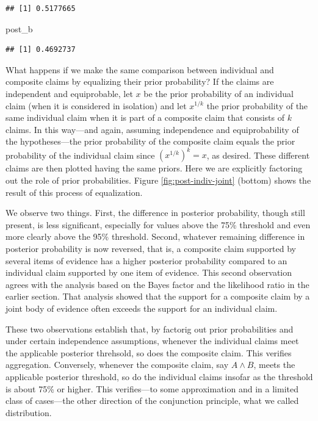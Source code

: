 \documentclass[
  10pt,
  dvipsnames,enabledeprecatedfontcommands]{scrartcl}
\newenvironment{Shaded}{\begin{snugshade}}{\end{snugshade}}
\newcommand{\NormalTok}[1]{#1}
\begin{document}
\begin{verbatim}
## [1] 0.5177665
\end{verbatim}

\begin{Shaded}
\begin{Highlighting}[]
\NormalTok{post\_b}
\end{Highlighting}
\end{Shaded}

\begin{verbatim}
## [1] 0.4692737
\end{verbatim}

What happens if we make the same comparison between individual and
composite claims by equalizing their prior probability? If the claims
are independent and equiprobable, let \(x\) be the prior probability of
an individual claim (when it is considered in isolation) and let
\(x^{1/k}\) the prior probability of the same individual claim when it
is part of a composite claim that consists of \(k\) claims. In this
way---and again, assuming independence and equiprobability of the
hypotheses---the prior probability of the composite claim equals the
prior probability of the individual claim since \((x^{1/k})^k=x\), as
desired. These different claims are then plotted having the same priors.
Here we are explicitly factoring out the role of prior probabilities.
Figure \ref{fig:post-indiv-joint} (bottom) shows the result of this
process of equalization.

We observe two things. First, the difference in posterior probability,
though still present, is less significant, especially for values above
the 75\% threshold and even more clearly above the 95\% threshold.
Second, whatever remaining difference in posterior probability is now
reversed, that is, a composite claim supported by several items of
evidence has a higher posterior probability compared to an individual
claim supported by one item of evidence. This second observation agrees
with the analysis based on the Bayes factor and the likelihood ratio in
the earlier section. That analysis showed that the support for a
composite claim by a joint body of evidence often exceeds the support
for an individual claim.

These two observations establish that, by factorig out prior
probabilities and under certain independence assumptions, whenever the
individual claims meet the applicable posterior threhsold, so does the
composite claim. This verifies aggregation. Conversely, whenever the
composite claim, say \(A \wedge B\), meets the applicable posterior
threshold, so do the individual claims insofar as the threshold is about
75\% or higher. This verifies---to some approximation and in a limited
class of cases---the other direction of the conjunction principle, what
we called distribution.
\end{document}
